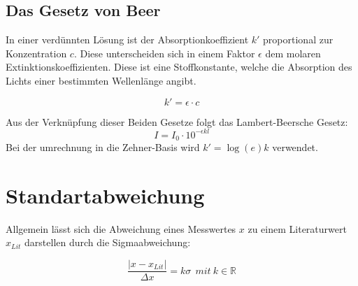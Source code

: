\subsection{Das Gesetz von Beer}
In einer verdünnten Lösung ist der Absorptionkoeffizient $k'$ proportional zur Konzentration $c$.
Diese unterscheiden sich in einem Faktor $\epsilon$ dem molaren Extinktionskoeffizienten. Diese
ist eine Stoffkonstante, welche die Absorption des Lichts einer bestimmten Wellenlänge angibt.

\begin{equation}
    k' = \epsilon \cdot c
    \label{eq:dekAbsorp}
\end{equation}

Aus der Verknüpfung dieser Beiden Gesetze folgt das Lambert-Beersche Gesetz:
\begin{equation}
    I = I_0 \cdot 10^{-\epsilon k l}
\end{equation}
Bei der umrechnung in die Zehner-Basis wird $k' = \log(e) k$ verwendet.

\section{Standartabweichung}
Allgemein lässt sich die Abweichung eines Messwertes $x$ zu einem Literaturwert $x_{Lit}$ darstellen durch die Sigmaabweichung:

\begin{equation}
    \frac{|x-x_{Lit}|}{\Delta x} = k \sigma \ \ mit \ k \in \mathbb{R}
    \label{eq:sigma}
\end{equation}
